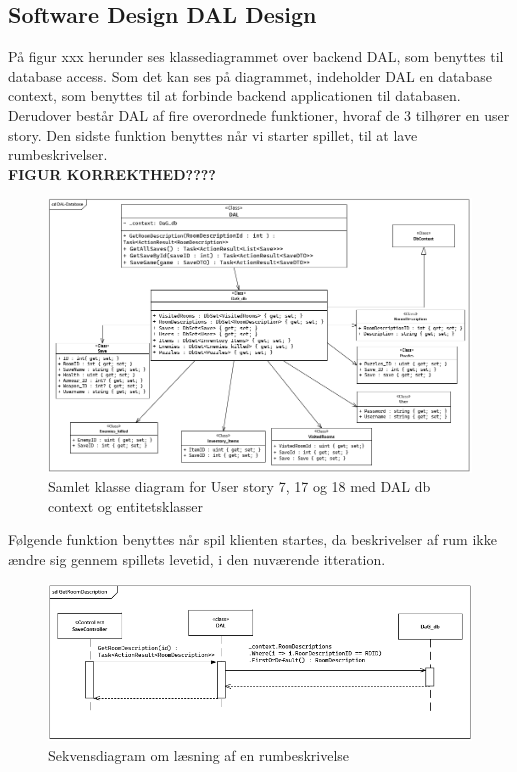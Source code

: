 \subsection{Software Design DAL Design}
På figur xxx herunder ses klassediagrammet over backend DAL, som benyttes til database access. 
Som det kan ses på diagrammet, indeholder DAL en database context, som benyttes til at forbinde backend applicationen til databasen. 
Derudover består DAL af fire overordnede funktioner, hvoraf de 3 tilhører en user story. 
Den sidste funktion benyttes når vi starter spillet, til at lave rumbeskrivelser.\\

\textbf{FIGUR KORREKTHED????}

\begin{figure}[H]
\centering
\includegraphics[width = \textwidth]{02-Body/Images/DAL-Database/DAL-DB-CD.PNG}
\caption{Samlet klasse diagram for User story 7, 17 og 18 med DAL db context og entitetsklasser}
\label{fig:DAL-Klasse-7-17-18}
\end{figure}

Følgende funktion benyttes når spil klienten startes, da beskrivelser af rum ikke ændre sig gennem spillets levetid, i den nuværende itteration.\\

\begin{figure}[H]
\centering
\includegraphics[width = \textwidth]{02-Body/Images/DAL-Database/RoomDescriptionSd.PNG}
\caption{Sekvensdiagram om læsning af en rumbeskrivelse}
\label{fig:DAL-Sekvens-RumBeskrivelser}
\end{figure}

